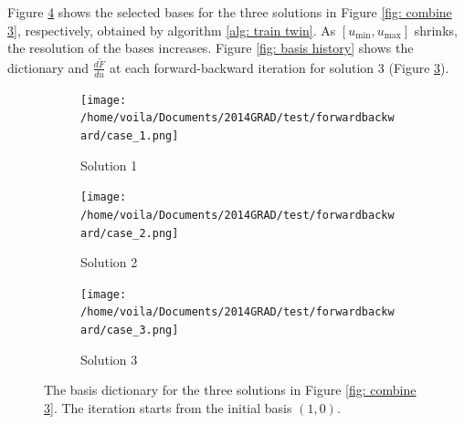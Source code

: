 Figure \ref{fig: basis pnt} shows the selected bases
for the three solutions in Figure \ref{fig: combine 3}, respectively, obtained by 
algorithm \ref{alg: train twin}.
As $\left[u_{\min}, u_{\max}\right]$ shrinks, 
the resolution of the bases increases. Figure \ref{fig: basis history} shows
the dictionary and $\frac{d\tilde{F}}{du}$ 
at each forward-backward iteration for solution 3 (Figure \ref{fig: basis pnt 3}).\\

\begin{figure}[htbp]\begin{center}
    \begin{subfigure}[t]{.32\textwidth}
        \centering
        \texttt{[image: /home/voila/Documents/2014GRAD/test/forwardbackward/case\_1.png]}
        \caption{Solution 1}
        \label{fig: basis pnt 1}
    \end{subfigure}
    \begin{subfigure}[t]{.32\textwidth}     
        \centering
        \texttt{[image: /home/voila/Documents/2014GRAD/test/forwardbackward/case\_2.png]}
        \caption{Solution 2}
        \label{fig: basis pnt 2}
    \end{subfigure}
    \begin{subfigure}[t]{.32\textwidth}
        \centering
        \texttt{[image: /home/voila/Documents/2014GRAD/test/forwardbackward/case\_3.png]}
        \caption{Solution 3}
        \label{fig: basis pnt 3}
    \end{subfigure}
    \caption{The basis dictionary for the three solutions in Figure \ref{fig: combine 3}.
             The iteration starts from the initial basis $(1,0)$.}
    \label{fig: basis pnt}
\end{center}\end{figure}


